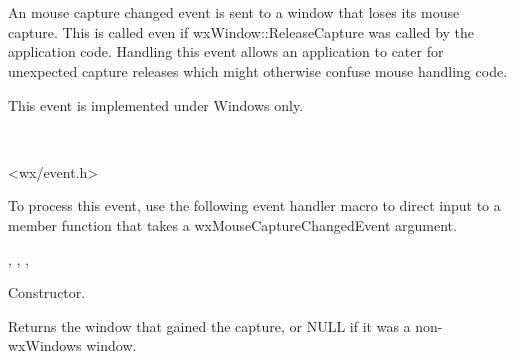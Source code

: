 \section{}\label{wxmousecapturechangedevent}

An mouse capture changed event is sent to a window that loses its
mouse capture. This is called even if wxWindow::ReleaseCapture
was called by the application code. Handling this event allows
an application to cater for unexpected capture releases which
might otherwise confuse mouse handling code.

This event is implemented under Windows only.


\\


<wx/event.h>


To process this event, use the following event handler macro to direct input to a member
function that takes a wxMouseCaptureChangedEvent argument.

\twocolwidtha{7cm}
\begin{twocollist}\itemsep=0pt
\end{twocollist}


, 
, 
, 




Constructor.

\label{wxmousecapturechangedeventgetcapturedwindow}


Returns the window that gained the capture, or NULL if it was a non-wxWindows window.

